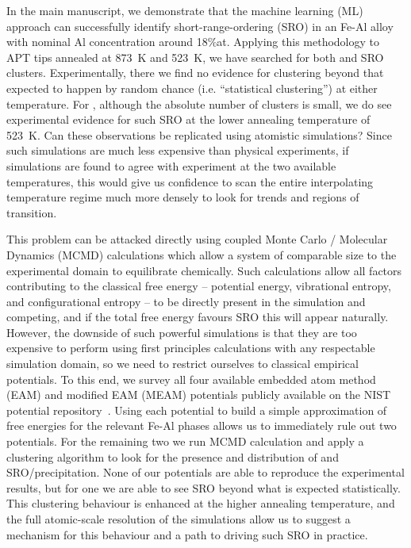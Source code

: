In the main manuscript, we demonstrate that the machine learning (ML) approach can successfully identify short-range-ordering (SRO) in an Fe-Al alloy with nominal Al concentration around 18\%at.
Applying this methodology to APT tips annealed at 873~K and 523~K, we have searched for both \DOTHREE and \BTWO SRO clusters.
Experimentally, there we find no evidence for \DOTHREE clustering beyond that expected to happen by random chance (i.e. ``statistical clustering'') at either temperature.
For \BTWO, although the absolute number of clusters is small, we do see experimental evidence for such SRO at the lower annealing temperature of 523~K.
Can these observations be replicated using atomistic simulations?
Since such simulations are much less expensive than physical experiments, if simulations are found to agree with experiment at the two available temperatures, this would give us confidence to scan the entire interpolating temperature regime much more densely to look for trends and regions of transition.

This problem can be attacked directly using coupled Monte Carlo / Molecular Dynamics (MCMD) calculations which allow a system of comparable size to the experimental domain to equilibrate chemically.
Such calculations allow all factors contributing to the classical free energy -- potential energy, vibrational entropy, and configurational entropy -- to be directly present in the simulation and competing, and if the total free energy favours SRO this will appear naturally.
However, the downside of such powerful simulations is that they are too expensive to perform using first principles calculations with any respectable simulation domain, so we need to restrict ourselves to classical empirical potentials.
To this end, we survey all four available embedded atom method (EAM) and modified EAM (MEAM) potentials publicly available on the NIST potential repository~\cite{nist}.
Using each potential to build a simple approximation of free energies for the relevant Fe-Al phases allows us to immediately rule out two potentials.
For the remaining two we run MCMD calculation and apply a clustering algorithm to look for the presence and distribution of \DOTHREE and \BTWO SRO/precipitation.
None of our potentials are able to reproduce the experimental results, but for one we are able to see \DOTHREE SRO beyond what is expected statistically.
This clustering behaviour is enhanced at the higher annealing temperature, and the full atomic-scale resolution of the simulations allow us to suggest a mechanism for this behaviour and a path to driving such SRO in practice.
